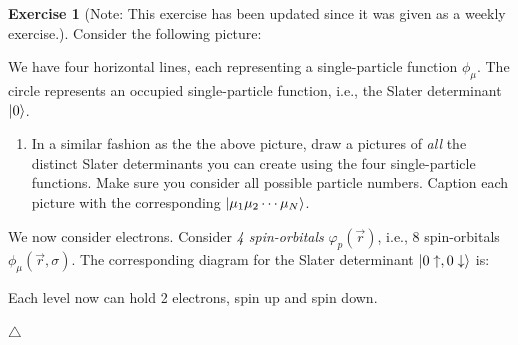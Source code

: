 \documentclass{report}
\theoremstyle{plain}
\theoremstyle{definition}
\newtheorem{exerc}{Exercise}[chapter]
\newcommand\xqed[1]{%
  \leavevmode\unskip\penalty9999 \hbox{}\nobreak\hfill
  \quad\hbox{#1}}
\newcommand\demo{\xqed{$\triangle$}}
\newenvironment{exercise}{\bigskip\begin{exerc}}{\demo\end{exerc}\bigskip}
\begin{document}
\begin{exercise}[Note: This exercise has been
  updated since it was given as a weekly exercise.]

  Consider the following picture:
  \begin{center}
  \end{center}
  We have four horizontal lines, each representing a single-particle
  function $\phi_\mu$. The circle represents an occupied
  single-particle function, i.e., the Slater determinant $\ket{0}$.

  \begin{enumerate}
  \item[a)] In a similar fashion as the the above picture, draw a
    pictures of \emph{all} the distinct Slater determinants you can
    create using the four single-particle functions. Make sure you
    consider all possible particle numbers. Caption each picture with
    the corresponding $\ket{\mu_1\mu_2\cdots\mu_N}$.
\end{enumerate}

We now consider electrons. Consider \emph{4 spin-orbitals}
$\varphi_p(\vec{r})$, i.e., $8$ spin-orbitals
$\phi_\mu(\vec{r},\sigma)$. The corresponding diagram for the Slater
determinant $\ket{0\uparrow,0\downarrow}$ is:
  \begin{center}
  \end{center}
  Each level now can hold 2 electrons, spin up and spin down. 


\end{exercise}
\end{document}
